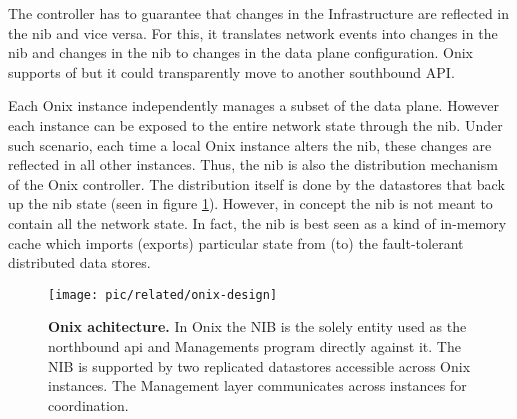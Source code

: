 The controller  has to guarantee that changes in the Infrastructure are reflected in the \gls{nib} and vice versa. 
For this, it translates network events into changes in the \gls{nib} and changes in the \gls{nib} to changes in the data plane configuration. 
Onix supports  \gls{of} but it could transparently move to another southbound API. 

Each Onix instance independently manages a subset of the data plane. 
However each instance can be exposed to the entire network state through  the \gls{nib}.  
Under such scenario, each time a local Onix instance alters the \gls{nib}, these changes are reflected in all other instances. 
Thus, the \gls{nib} is also the distribution mechanism of the Onix controller. 
The distribution itself is done by the datastores that back up  the \gls{nib} state (seen in figure \ref{fig:onix-design}).
However, in concept the \gls{nib} is not meant to contain all the network state. 
In fact, the \gls{nib} is best seen as a kind of in-memory cache which imports (exports) particular state from  (to) the fault-tolerant distributed data stores. 

\begin{figure}
  \centering 
  \texttt{[image: pic/related/onix-design]}
  \caption[Onix architecture] {\textbf{Onix achitecture.} In Onix the NIB is the
    solely entity used as the northbound api and Managements program
    directly against it. The NIB is supported by
    two replicated datastores accessible across Onix instances.  The
    Management layer communicates across instances for coordination.}
  \label{fig:onix-design}
\end{figure}



